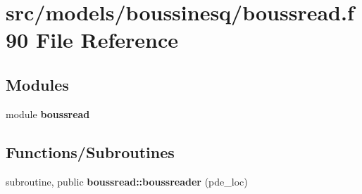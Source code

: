 \section{src/models/boussinesq/boussread.f90 File Reference}
\label{boussread_8f90}
\subsection*{Modules}
\begin{DoxyCompactItemize}
\item 
module {\bf boussread}
\end{DoxyCompactItemize}
\subsection*{Functions/\+Subroutines}
\begin{DoxyCompactItemize}
\item 
subroutine, public {\bf boussread\+::boussreader} (pde\+\_\+loc)
\end{DoxyCompactItemize}
